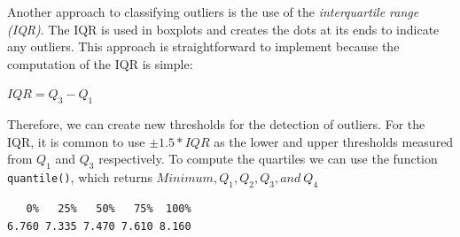 \documentclass[
  letterpaper,
]{krantz}
\makeatletter
\newenvironment{Shaded}{\begin{snugshade}}{\end{snugshade}}
\newcommand{\AttributeTok}[1]{\textcolor[rgb]{0.40,0.45,0.13}{#1}}
\newcommand{\CommentTok}[1]{\textcolor[rgb]{0.37,0.37,0.37}{#1}}
\newcommand{\ConstantTok}[1]{\textcolor[rgb]{0.56,0.35,0.01}{#1}}
\newcommand{\DecValTok}[1]{\textcolor[rgb]{0.68,0.00,0.00}{#1}}
\newcommand{\FloatTok}[1]{\textcolor[rgb]{0.68,0.00,0.00}{#1}}
\newcommand{\FunctionTok}[1]{\textcolor[rgb]{0.28,0.35,0.67}{#1}}
\newcommand{\NormalTok}[1]{\textcolor[rgb]{0.00,0.23,0.31}{#1}}
\newcommand{\OtherTok}[1]{\textcolor[rgb]{0.00,0.23,0.31}{#1}}
\newcommand{\SpecialCharTok}[1]{\textcolor[rgb]{0.37,0.37,0.37}{#1}}
\newcommand{\StringTok}[1]{\textcolor[rgb]{0.13,0.47,0.30}{#1}}
\newenvironment{kframe}{%
\medskip{}
\setlength{\fboxsep}{.8em}
 \def\at@end@of@kframe{}%
 \ifinner\ifhmode%
  \def\at@end@of@kframe{\end{minipage}}%
  \begin{minipage}{\columnwidth}%
 \fi\fi%
 \def\FrameCommand##1{\hskip\@totalleftmargin \hskip-\fboxsep
 \colorbox{shadecolor}{##1}\hskip-\fboxsep
     \hskip-\linewidth \hskip-\@totalleftmargin \hskip\columnwidth}%
 \MakeFramed {\advance\hsize-\width
   \@totalleftmargin\z@ \linewidth\hsize
   \@setminipage}}%
 {\par\unskip\endMakeFramed%
 \at@end@of@kframe}
\renewenvironment{Shaded}{\begin{kframe}}{\end{kframe}}
\makeatother
\begin{document}
Another approach to classifying outliers is the use of the
\emph{interquartile range (IQR)}. The IQR is used in boxplots and
creates the dots at its ends to indicate any outliers. This approach is
straightforward to implement because the computation of the IQR is
simple:

\label{iqr-formula}
\(IQR = Q_{3}-Q_{1}\)

Therefore, we can create new thresholds for the detection of outliers.
For the IQR, it is common to use \(\pm 1.5 * IQR\) as the lower and
upper thresholds measured from \(Q_1\) and \(Q_3\) respectively. To
compute the quartiles we can use the function \texttt{quantile()}, which
returns \(Minimum, Q_1, Q_2, Q_3, and\ Q_4\)

\begin{Shaded}
\end{Shaded}

\begin{verbatim}
   0%   25%   50%   75%  100% 
6.760 7.335 7.470 7.610 8.160 
\end{verbatim}

\begin{Shaded}
\end{Shaded}
\end{document}
